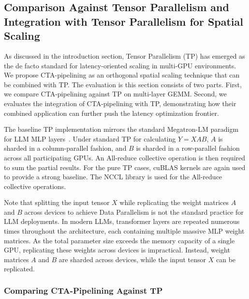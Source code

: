 \subsection{Comparison Against Tensor Parallelism and Integration with Tensor Parallelism for Spatial Scaling}

As discussed in the introduction section, Tensor Parallelism (TP) has emerged as the de facto standard for latency-oriented scaling in multi-GPU environments. We propose CTA-pipelining as an orthogonal spatial scaling technique that can be combined with TP. The evaluation is this section consists of two parts. First, we compare CTA-pipelining against TP on multi-layer GEMM. Second, we evaluates the integration of CTA-pipelining with TP, demonstrating how their combined application can further push the latency optimization frontier.

The baseline TP implementation mirrors the standard Megatron-LM paradigm for LLM MLP layers~\cite{shoeybi2019megatron}. Under standard TP for calculating $Y = XAB$, $A$ is sharded in a column-parallel fashion, and $B$ is sharded in a row-parallel fashion across all participating GPUs. An All-reduce collective operation is then required to sum the partial results. For the pure TP cases, cuBLAS kernels are again used to provide a strong baseline. The NCCL library is used for the All-reduce collective operations.

Note that splitting the input tensor $X$ while replicating the weight matrices $A$ and $B$ across devices to achieve Data Parallelism is not the standard practice for LLM deployments. In modern LLMs, transformer layers are repeated numerous times throughout the architecture, each containing multiple massive MLP weight matrices. As the total parameter size exceeds the memory capacity of a single GPU, replicating these weights across devices is impractical. Instead, weight matrices $A$ and $B$ are sharded across devices, while the input tensor $X$ can be replicated. 


\subsubsection{Comparing CTA-Pipelining Against TP}



